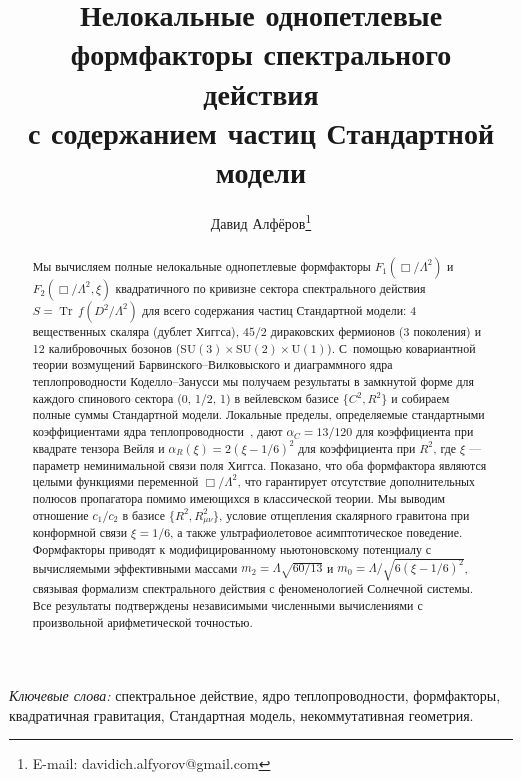 \documentclass[12pt,a4paper]{article}
\newcommand{\Tr}{\operatorname{Tr}}
\begin{document}
\title{Нелокальные однопетлевые формфакторы спектрального действия\\с содержанием частиц Стандартной модели}

\author{Давид Алфёров\footnote{E-mail: davidich.alfyorov@gmail.com}}

\date{}

\maketitle

\begin{abstract}
Мы вычисляем полные нелокальные однопетлевые формфакторы $F_1(\Box/\Lambda^2)$
и $F_2(\Box/\Lambda^2,\xi)$ квадратичного по кривизне сектора спектрального
действия $S = \Tr\,f(D^2/\Lambda^2)$ для всего содержания частиц Стандартной
модели: 4 вещественных скаляра (дублет Хиггса), $45/2$ дираковских
фермионов (3 поколения) и 12 калибровочных бозонов
($\mathrm{SU}(3)\times\mathrm{SU}(2)\times\mathrm{U}(1)$).
С~помощью ковариантной теории возмущений Барвинского--Вилковыского и
диаграммного ядра теплопроводности Коделло--Занусси мы получаем
результаты в замкнутой форме для каждого спинового сектора (0, 1/2, 1)
в вейлевском базисе $\{C^2, R^2\}$ и собираем полные суммы Стандартной модели.
Локальные пределы, определяемые стандартными коэффициентами
ядра теплопроводности~\cite{Gilkey:1975iq,Vassilevich:2003xt}, дают
$\alpha_C = 13/120$ для коэффициента при квадрате тензора Вейля и
$\alpha_R(\xi) = 2(\xi-1/6)^2$ для коэффициента при $R^2$, где $\xi$ ---
параметр неминимальной связи поля Хиггса. Показано, что оба формфактора
являются целыми функциями переменной $\Box/\Lambda^2$, что гарантирует
отсутствие дополнительных полюсов пропагатора помимо имеющихся в
классической теории.
Мы выводим отношение $c_1/c_2$ в базисе $\{R^2, R_{\mu\nu}^2\}$, условие
отщепления скалярного гравитона при конформной связи $\xi = 1/6$, а также
ультрафиолетовое асимптотическое поведение. Формфакторы приводят к
модифицированному ньютоновскому потенциалу с вычисляемыми
эффективными массами $m_2 = \Lambda\sqrt{60/13}$ и
$m_0 = \Lambda/\sqrt{6(\xi-1/6)^2}$, связывая формализм спектрального
действия с феноменологией Солнечной системы. Все результаты подтверждены
независимыми численными вычислениями с произвольной арифметической точностью.
\end{abstract}

\textit{Ключевые слова:} спектральное действие, ядро теплопроводности, формфакторы,
квадратичная гравитация, Стандартная модель, некоммутативная геометрия.
\end{document}
